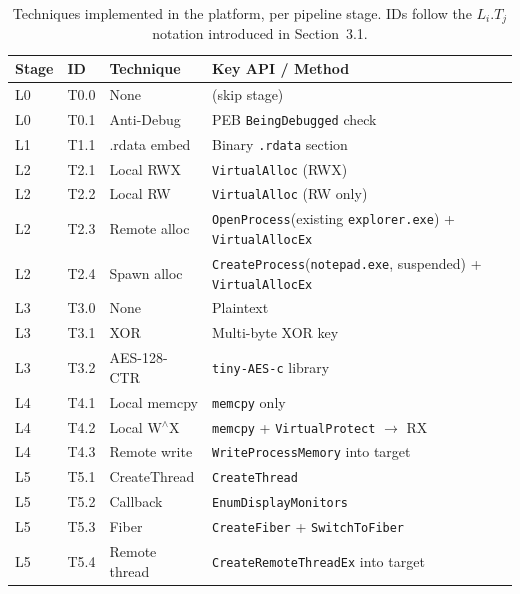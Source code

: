 \begin{table}[htbp]
    \centering
    \caption{Techniques implemented in the platform, per pipeline stage. IDs follow the $L_i.T_j$ notation introduced in Section~3.1.}
    \label{tab:techniques}
    \small
    \begin{tabular}{@{}llll@{}}
        \toprule
        \textbf{Stage} & \textbf{ID} & \textbf{Technique} & \textbf{Key API / Method} \\
        \midrule
        L0 & T0.0 & None                & (skip stage) \\
        L0 & T0.1 & Anti-Debug          & PEB \texttt{BeingDebugged} check \\
        L1 & T1.1 & .rdata embed        & Binary \texttt{.rdata} section \\
        L2 & T2.1 & Local RWX           & \texttt{VirtualAlloc} (RWX) \\
        L2 & T2.2 & Local RW            & \texttt{VirtualAlloc} (RW only) \\
        L2 & T2.3 & Remote alloc        & \texttt{OpenProcess}(existing \texttt{explorer.exe}) + \texttt{VirtualAllocEx} \\
        L2 & T2.4 & Spawn alloc         & \texttt{CreateProcess}(\texttt{notepad.exe}, suspended) + \texttt{VirtualAllocEx} \\
        L3 & T3.0 & None                & Plaintext \\
        L3 & T3.1 & XOR                 & Multi-byte XOR key \\
        L3 & T3.2 & AES-128-CTR         & \texttt{tiny-AES-c} library \\
        L4 & T4.1 & Local memcpy        & \texttt{memcpy} only \\
        L4 & T4.2 & Local W$^{\wedge}$X & \texttt{memcpy} + \texttt{VirtualProtect} $\rightarrow$ RX \\
        L4 & T4.3 & Remote write        & \texttt{WriteProcessMemory} into target \\
        L5 & T5.1 & CreateThread        & \texttt{CreateThread} \\
        L5 & T5.2 & Callback            & \texttt{EnumDisplayMonitors} \\
        L5 & T5.3 & Fiber               & \texttt{CreateFiber} + \texttt{SwitchToFiber} \\
        L5 & T5.4 & Remote thread       & \texttt{CreateRemoteThreadEx} into target \\
        \bottomrule
    \end{tabular}
\end{table}

